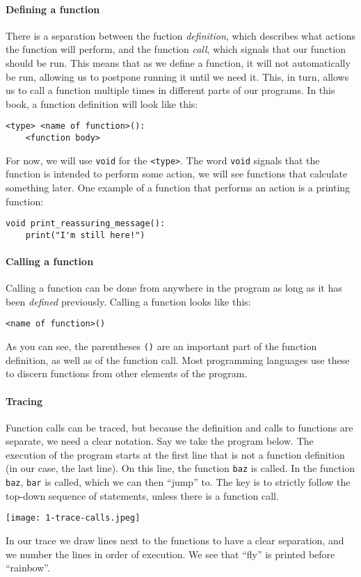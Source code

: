 \paragraph{Defining a function}

There is a separation between the fuction \emph{definition}, which describes what actions the function will perform, and the function \emph{call}, which signals that our function should be run. This means that as we define a function, it will not automatically be run, allowing us to postpone running it until we need it. This, in turn, allows us to call a function multiple times in different parts of our programs. In this book, a function definition will look like this:

\begin{verbatim}
<type> <name of function>():
    <function body>
\end{verbatim}

For now, we will use \texttt{void} for the \texttt{<type>}. The word \texttt{void} signals that the function is intended to perform some action, we will see functions that calculate something later. One example of a function that performs an action is a printing function:

\begin{verbatim}
void print_reassuring_message():
    print("I'm still here!")
\end{verbatim}

\paragraph{Calling a function}

Calling a function can be done from anywhere in the program as long as it has been \emph{defined} previously. Calling a function looks like this:

\begin{verbatim}
<name of function>()
\end{verbatim}

As you can see, the parentheses \texttt{()} are an important part of the function definition, as well as of the function call. Most programming languages use these to discern functions from other elements of the program.


\paragraph{Tracing} Function calls can be traced, but because the definition and calls to functions are separate, we need a clear notation. Say we take the program below. The execution of the program starts at the first line that is not a function definition (in our case, the last line). On this line, the function \texttt{baz} is called. In the function \texttt{baz}, \texttt{bar} is called, which we can then ``jump''  to. The key is to strictly follow the top-down sequence of statements, unless there is a function call.

\texttt{[image: 1-trace-calls.jpeg]}

In our trace we draw lines next to the functions to have a clear separation, and we number the lines in order of execution. We see that ``fly'' is printed before ``rainbow''.
